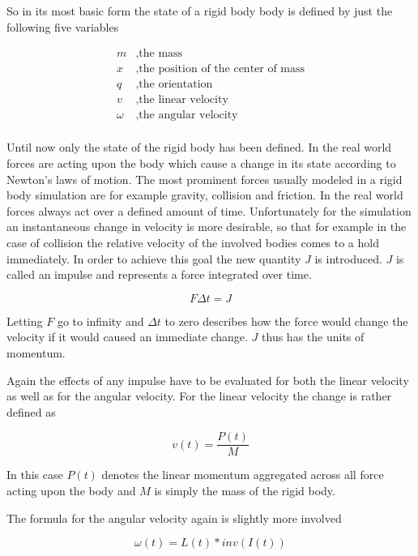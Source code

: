 So in its most basic form the state of a rigid body body is defined by just the following five variables

\begin{align*}
m &, \text{the mass} \\
x &, \text{the position of the center of mass} \\
q &, \text{the orientation} \\
v &, \text{the linear velocity} \\
\omega &, \text{the angular velocity} \\
\end{align*}

Until now only the state of the rigid body has been defined. In the real world forces are acting upon the body which cause a change in its state according to Newton's laws of motion. The most prominent forces usually modeled in a rigid body simulation are for example gravity, collision and friction. In the real world forces always act over a defined amount of time. Unfortunately for the simulation an instantaneous change in velocity is more desirable, so that for example in the case of collision the relative velocity of the involved bodies comes to a hold immediately. In order to achieve this goal the new quantity $J$ is introduced. $J$ is called an impulse and represents a force integrated over time.

\begin{equation}
F \Delta t = J
\end{equation}

Letting $F$ go to infinity and $\Delta t$ to zero describes how the force would change the velocity if it would caused an immediate change. $J$ thus has the units of momentum. 

Again the effects of any impulse have to be evaluated for both the linear velocity as well as for the angular velocity. For the linear velocity the change is rather defined as

\begin{equation}
v(t) = \frac{P(t)}{M}
\end{equation}

In this case $P(t)$ denotes the linear momentum aggregated across all force acting upon the body and $M$ is simply the mass of the rigid body.

The formula for the angular velocity again is slightly more involved

\begin{equation}
\omega(t) = L(t) * inv(I(t))
\end{equation}


